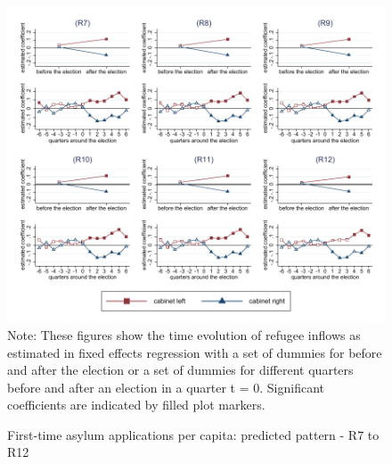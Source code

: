 \documentclass[11pt,a4paper]{scrartcl}
\begin{document}
\clearpage
\FloatBarrier
\begin{figure}[!ht]
	\caption{First-time asylum applications per capita: predicted pattern - R7 to R12}
	\includegraphics[width=1\textwidth]{../results/applications/app_graphs_R7-R12.pdf}
	\footnotesize{Note: These figures show the time evolution of refugee inflows as estimated in fixed effects regression
		with a set of dummies for before and after the election or a set of dummies for different quarters before and after an election in a quarter t = 0. Significant coefficients are indicated by filled plot markers.}
\end{figure}

\clearpage
\FloatBarrier




\clearpage
\FloatBarrier

\end{document}

